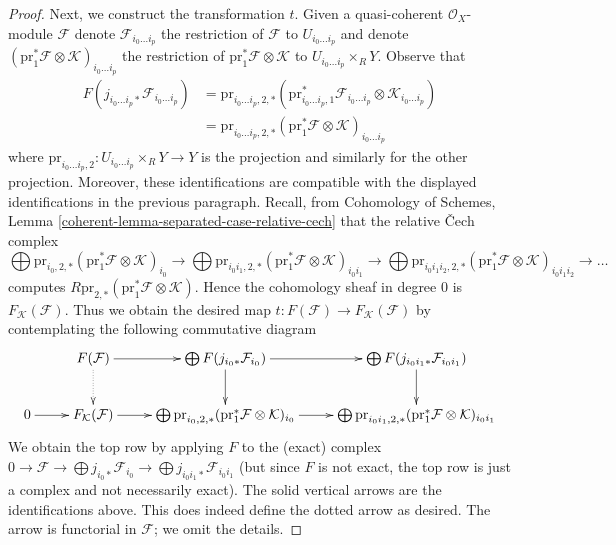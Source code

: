 \documentclass[10pt,a4paper]{amsart}
\theoremstyle{plain}
\theoremstyle{definition}
\theoremstyle{remark}
\numberwithin{equation}{subsection}
\begin{document}
\begin{proof}
\medskip\noindent
Next, we construct the transformation $t$. Given a quasi-coherent
$\mathcal{O}_X$-module $\mathcal{F}$ denote $\mathcal{F}_{i_0 \ldots i_p}$
the restriction of $\mathcal{F}$ to $U_{i_0 \ldots i_p}$ and denote
$(\text{pr}_1^*\mathcal{F} \otimes \mathcal{K})_{i_0 \ldots i_p}$
the restriction of $\text{pr}_1^*\mathcal{F} \otimes \mathcal{K}$ to
$U_{i_0 \ldots i_p} \times_R Y$.
Observe that
\begin{align*}
F(j_{i_0 \ldots i_p *}\mathcal{F}_{i_0 \ldots i_p})
& =
\text{pr}_{i_0 \ldots i_p, 2, *}(
\text{pr}_{i_0 \ldots i_p, 1}^*\mathcal{F}_{i_0 \ldots i_p}
\otimes \mathcal{K}_{i_0 \ldots i_p}) \\
& =
\text{pr}_{i_0 \ldots i_p, 2, *}
(\text{pr}_1^*\mathcal{F} \otimes \mathcal{K})_{i_0 \ldots i_p}
\end{align*}
where $\text{pr}_{i_0 \ldots i_p, 2} : U_{i_0 \ldots i_p} \times_R Y \to Y$
is the projection and similarly for the other projection. Moreover, these
identifications are compatible with the displayed identifications
in the previous paragraph. Recall, from Cohomology of Schemes, Lemma
\ref{coherent-lemma-separated-case-relative-cech}
that the relative {\v C}ech complex
$$
\bigoplus 
\text{pr}_{i_0, 2, *}
(\text{pr}_1^*\mathcal{F} \otimes \mathcal{K})_{i_0}
\to
\bigoplus 
\text{pr}_{i_0i_1, 2, *}
(\text{pr}_1^*\mathcal{F} \otimes \mathcal{K})_{i_0i_1}
\to
\bigoplus 
\text{pr}_{i_0i_1i_2, 2, *}
(\text{pr}_1^*\mathcal{F} \otimes \mathcal{K})_{i_0i_1i_2}
\to \ldots
$$
computes $R\text{pr}_{2, *}(\text{pr}_1^*\mathcal{F} \otimes \mathcal{K})$.
Hence the cohomology sheaf in degree $0$ is $F_\mathcal{K}(\mathcal{F})$.
Thus we obtain the desired map
$t : F(\mathcal{F}) \to F_\mathcal{K}(\mathcal{F})$
by contemplating the following commutative diagram
$$
\xymatrix{
&
F(\mathcal{F}) \ar[r] \ar@{..>}[d] &
\bigoplus F(j_{i_0*}\mathcal{F}_{i_0}) \ar[r] \ar[d] &
\bigoplus F(j_{i_0i_1*}\mathcal{F}_{i_0i_1}) \ar[d] \\
0 \ar[r] &
F_\mathcal{K}(\mathcal{F}) \ar[r] &
\bigoplus 
\text{pr}_{i_0, 2, *}
(\text{pr}_1^*\mathcal{F} \otimes \mathcal{K})_{i_0}
\ar[r] &
\bigoplus 
\text{pr}_{i_0i_1, 2, *}
(\text{pr}_1^*\mathcal{F} \otimes \mathcal{K})_{i_0i_1}
}
$$
We obtain the top row by applying $F$ to the (exact) complex
$0 \to \mathcal{F} \to \bigoplus j_{i_0*}\mathcal{F}_{i_0} \to
\bigoplus j_{i_0i_1*}\mathcal{F}_{i_0i_1}$ (but since
$F$ is not exact, the top row is just a complex and not
necessarily exact).
The solid vertical arrows are the identifications above.
This does indeed define the dotted arrow as desired.
The arrow is functorial in $\mathcal{F}$; we omit the details.


\end{proof}
\end{document}
